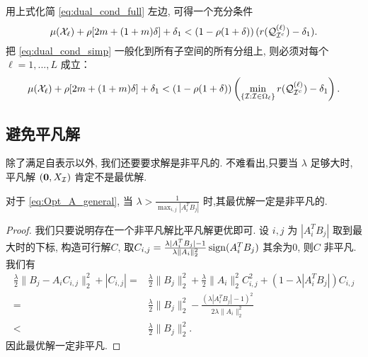 用上式化简 \eqref{eq:dual_cond_full} 左边, 可得一个充分条件
\begin{equation}\label{eq:dual_cond_simp}
  \mu(\mathcal{X}_{\ell}) +\rho [2m+(1+m)\delta] +\delta_1
  < \left(1-\rho(1+\delta)\right)(r(\mathcal{Q}_{\mathcal{I}^c}^{(\ell)})-\delta_1).
\end{equation}
把 \eqref{eq:dual_cond_simp} 一般化到所有子空间的所有分组上,
则必须对每个\(\ell = 1,...,L\) 成立：
\begin{equation}\label{eq:Thm1_all}
  \mu(\mathcal{X}_{\ell}) +\rho [2m+(1+m)\delta] +\delta_1
  < \left(1-\rho(1+\delta)\right)\left(\min_{\{\mathcal{I}: \mathcal{I}\in \Omega_\ell\}}r(\mathcal{Q}^{(\ell)}_{\mathcal{I}^c})-\delta_1\right).
\end{equation}

\subsection{避免平凡解}\label{sec:avoid_trivial}
除了满足自表示以外, 我们还要要求解是非平凡的. 不难看出,只要当 \(\lambda\)
足够大时, 平凡解 \((\mathbf{0}, X_{\mathcal{I}})\) 肯定不是最优解.

\begin{lemma}\label{lemma:avoid_trivial}
  对于 \eqref{eq:Opt_A_general},   当 \(\lambda > \frac{1}{\max_{i,j} |A_i^T
B_j|}\) 时,其最优解一定是非平凡的.
\end{lemma}
\begin{proof}
  我们只要说明存在一个非平凡解比平凡解更优即可. 设 \(i, j\) 为 \(|A_i^T
  B_j|\) 取到最大时的下标, 构造可行解\(C\), 
  取\(C_{i,j} = \frac{\lambda |A_i^T B_j|-1}{\lambda \|A_i\|_2^2} \operatorname{sign}(A_i^T B_j)\) 
  其余为\(0\), 则\(C\) 非平凡.我们有
  \begin{align*}
    \frac{\lambda}{2} \|B_j - A_i C_{i, j} \|_2^2 + |C_{i, j}| =& \frac{\lambda}{2}
    \|B_j\|_2^2 + \frac{\lambda}{2} \|A_i\|_2^2 C_{i,j}^2 +\left( 1-\lambda |A_i^T B_j|
    \right)C_{i,j} \\
    =&\frac{\lambda}{2} \|B_j\|_2^2 - \frac{(\lambda|A_i^T B_j| -1)^2}
    {2 \lambda \|A_i\|_2^2 }\\
    <& \frac{\lambda}{2} \|B_j\|_2^2. 
  \end{align*}
  因此最优解一定非平凡.
\end{proof}

